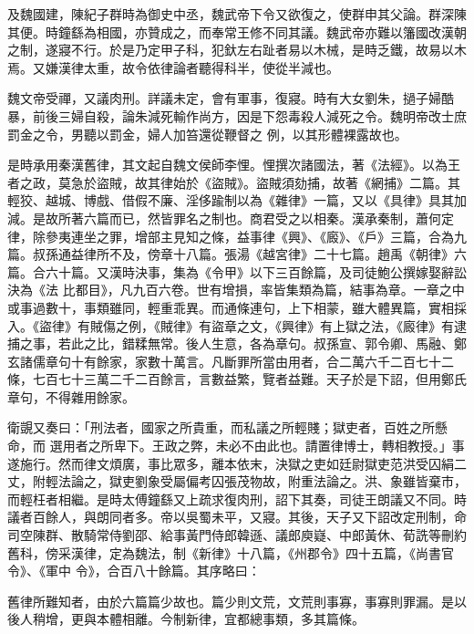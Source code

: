 \begin{pinyinscope}
 及魏國建，陳紀子群時為御史中丞，魏武帝下令又欲復之，使群申其父論。群深陳其便。時鐘繇為相國，亦贊成之，而奉常王修不同其議。魏武帝亦難以籓國改漢朝之制，遂寢不行。於是乃定甲子科，犯釱左右趾者易以木械，是時乏鐵，故易以木焉。又嫌漢律太重，故令依律論者聽得科半，使從半減也。



 魏文帝受禪，又議肉刑。詳議未定，會有軍事，復寢。時有大女劉朱，撾子婦酷暴，前後三婦自殺，論朱減死輸作尚方，因是下怨毒殺人減死之令。魏明帝改士庶罰金之令，男聽以罰金，婦人加笞還從鞭督之
 例，以其形體裸露故也。



 是時承用秦漢舊律，其文起自魏文侯師李悝。悝撰次諸國法，著《法經》。以為王者之政，莫急於盜賊，故其律始於《盜賊》。盜賊須劾捕，故著《網捕》二篇。其輕狡、越城、博戲、借假不廉、淫侈踰制以為《雜律》一篇，又以《具律》具其加減。是故所著六篇而已，然皆罪名之制也。商君受之以相秦。漢承秦制，蕭何定律，除參夷連坐之罪，增部主見知之條，益事律《興》、《廄》、《戶》三篇，合為九篇。叔孫通益律所不及，傍章十八篇。張湯《越宮律》二十七篇。趙禹《朝律》六篇。合六十篇。又漢時決事，集為《令甲》以下三百餘篇，及司徒鮑公撰嫁娶辭訟決為《法
 比都目》，凡九百六卷。世有增損，率皆集類為篇，結事為章。一章之中或事過數十，事類雖同，輕重乖異。而通條連句，上下相蒙，雖大體異篇，實相採入。《盜律》有賊傷之例，《賊律》有盜章之文，《興律》有上獄之法，《廄律》有逮捕之事，若此之比，錯糅無常。後人生意，各為章句。叔孫宣、郭令卿、馬融、鄭玄諸儒章句十有餘家，家數十萬言。凡斷罪所當由用者，合二萬六千二百七十二條，七百七十三萬二千二百餘言，言數益繁，覽者益難。天子於是下詔，但用鄭氏章句，不得雜用餘家。



 衛覬又奏曰：「刑法者，國家之所貴重，而私議之所輕賤；獄吏者，百姓之所懸命，而
 選用者之所卑下。王政之弊，未必不由此也。請置律博士，轉相教授。」事遂施行。然而律文煩廣，事比眾多，離本依末，決獄之吏如廷尉獄吏范洪受囚絹二丈，附輕法論之，獄吏劉象受屬偏考囚張茂物故，附重法論之。洪、象雖皆棄市，而輕枉者相繼。是時太傅鐘繇又上疏求復肉刑，詔下其奏，司徒王朗議又不同。時議者百餘人，與朗同者多。帝以吳蜀未平，又寢。其後，天子又下詔改定刑制，命司空陳群、散騎常侍劉邵、給事黃門侍郎韓遜、議郎庾嶷、中郎黃休、荀詵等刪約舊科，傍采漢律，定為魏法，制《新律》十八篇，《州郡令》四十五篇，《尚書官令》、《軍中
 令》，合百八十餘篇。其序略曰：



 舊律所難知者，由於六篇篇少故也。篇少則文荒，文荒則事寡，事寡則罪漏。是以後人稍增，更與本體相離。今制新律，宜都總事類，多其篇條。




\end{pinyinscope}
